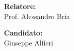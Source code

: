 \vspace{20mm}


\begin{minipage}[t]{0.47\textwidth}
	{\normalsize{\textbf{Relatore:}}{\normalsize\vspace{3mm}
	\\ \large{Prof. Alessandro Bria}}}
\end{minipage}
\hfill
\begin{minipage}[t]{0.47\textwidth}\raggedleft
	{\normalsize{\textbf{Candidato:}}{\normalsize\vspace{3mm} 
        \\ \large{Giuseppe Alfieri}}}
\end{minipage}


\vspace{30mm}


{\par}



